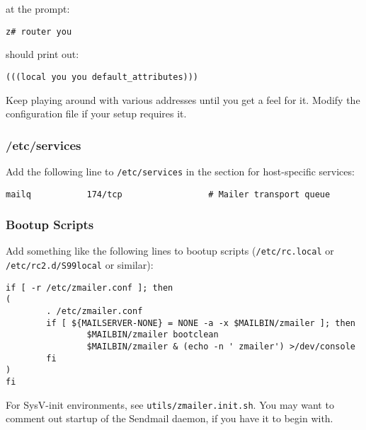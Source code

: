 at the prompt:
\begin{tscreen}
\begin{verbatim}
z# router you
\end{verbatim}
\end{tscreen}

should print out:
\begin{tscreen}
\begin{verbatim}
(((local you you default_attributes)))
\end{verbatim}
\end{tscreen}


Keep playing around with various addresses until you get a feel for it.
Modify the configuration file if your setup requires it.




\subsubsection{/etc/services}

Add the following line to {\tt /etc/services} in the section for
host-specific services:
\begin{tscreen}
\begin{verbatim}
mailq           174/tcp                 # Mailer transport queue
\end{verbatim}
\end{tscreen}





\subsubsection{Bootup Scripts}

Add something like the following lines to bootup scripts ({\tt /etc/rc.local}
or {\tt /etc/rc2.d/S99local} or similar):
\begin{tscreen}
\begin{verbatim}
if [ -r /etc/zmailer.conf ]; then
(
        . /etc/zmailer.conf
        if [ ${MAILSERVER-NONE} = NONE -a -x $MAILBIN/zmailer ]; then
                $MAILBIN/zmailer bootclean
                $MAILBIN/zmailer & (echo -n ' zmailer') >/dev/console
        fi
)
fi
\end{verbatim}
\end{tscreen}

For SysV-init environments, see {\tt utils/zmailer.init.sh}.
You may want to comment out startup of the Sendmail daemon, if you have it to begin with.




